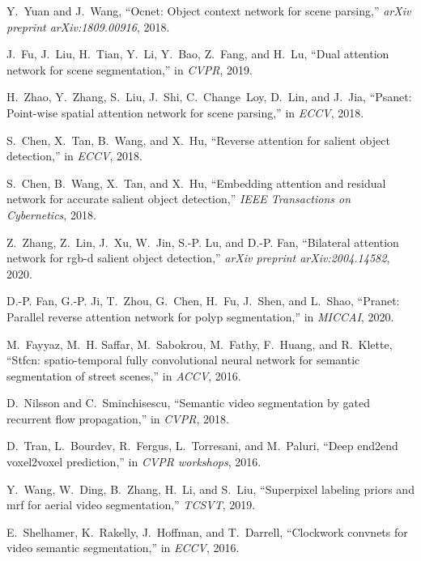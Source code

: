 \documentclass[journal]{IEEEtran}
\begin{document}
\begin{thebibliography}{10}
	Y.~Yuan and J.~Wang, ``Ocnet: Object context network for scene parsing,''
	\emph{arXiv preprint arXiv:1809.00916}, 2018.
	
	J.~Fu, J.~Liu, H.~Tian, Y.~Li, Y.~Bao, Z.~Fang, and H.~Lu, ``Dual attention
	network for scene segmentation,'' in \emph{CVPR}, 2019.
	
	H.~Zhao, Y.~Zhang, S.~Liu, J.~Shi, C.~Change~Loy, D.~Lin, and J.~Jia, ``Psanet:
	Point-wise spatial attention network for scene parsing,'' in \emph{ECCV},
	2018.
	
	S.~Chen, X.~Tan, B.~Wang, and X.~Hu, ``Reverse attention for salient object
	detection,'' in \emph{ECCV}, 2018.
	
	S.~Chen, B.~Wang, X.~Tan, and X.~Hu, ``Embedding attention and residual network
	for accurate salient object detection,'' \emph{IEEE Transactions on
		Cybernetics}, 2018.
	
	Z.~Zhang, Z.~Lin, J.~Xu, W.~Jin, S.-P. Lu, and D.-P. Fan, ``Bilateral attention
	network for rgb-d salient object detection,'' \emph{arXiv preprint
		arXiv:2004.14582}, 2020.
	
	D.-P. Fan, G.-P. Ji, T.~Zhou, G.~Chen, H.~Fu, J.~Shen, and L.~Shao, ``Pranet:
	Parallel reverse attention network for polyp segmentation,'' in
	\emph{MICCAI}, 2020.
	
	M.~Fayyaz, M.~H. Saffar, M.~Sabokrou, M.~Fathy, F.~Huang, and R.~Klette,
	``Stfcn: spatio-temporal fully convolutional neural network for semantic
	segmentation of street scenes,'' in \emph{ACCV}, 2016.
	
	D.~Nilsson and C.~Sminchisescu, ``Semantic video segmentation by gated
	recurrent flow propagation,'' in \emph{CVPR}, 2018.
	
	D.~Tran, L.~Bourdev, R.~Fergus, L.~Torresani, and M.~Paluri, ``Deep end2end
	voxel2voxel prediction,'' in \emph{CVPR workshops}, 2016.
	
	Y.~Wang, W.~Ding, B.~Zhang, H.~Li, and S.~Liu, ``Superpixel labeling priors and
	mrf for aerial video segmentation,'' \emph{TCSVT}, 2019.
	
	E.~Shelhamer, K.~Rakelly, J.~Hoffman, and T.~Darrell, ``Clockwork convnets for
	video semantic segmentation,'' in \emph{ECCV}, 2016.
	

\end{thebibliography}
\end{document}
